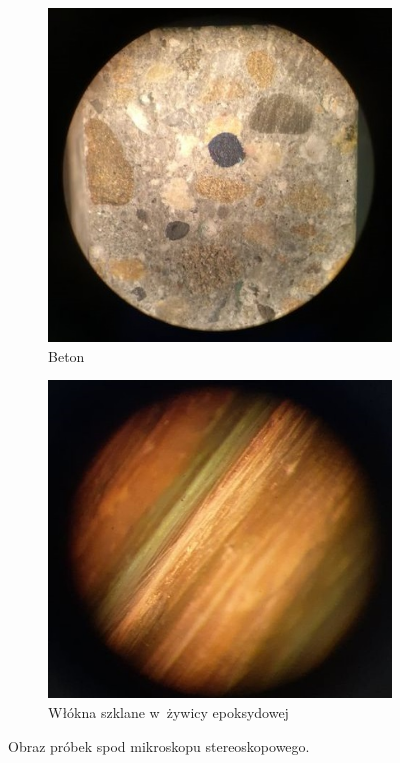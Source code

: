 \begin{figure}[H]
    \begin{subfigure}{.5\textwidth}
        \centering
        \includegraphics[width=.8\linewidth]{img/beton.jpg}  
        \caption{Beton}
    \end{subfigure}
    \begin{subfigure}{.5\textwidth}
        \centering
        \includegraphics[width=.9\linewidth]{img/włókno.jpg}  
        \caption{Włókna szklane w~żywicy epoksydowej}
    \end{subfigure}
    \caption{Obraz próbek spod mikroskopu stereoskopowego.}
\end{figure}

